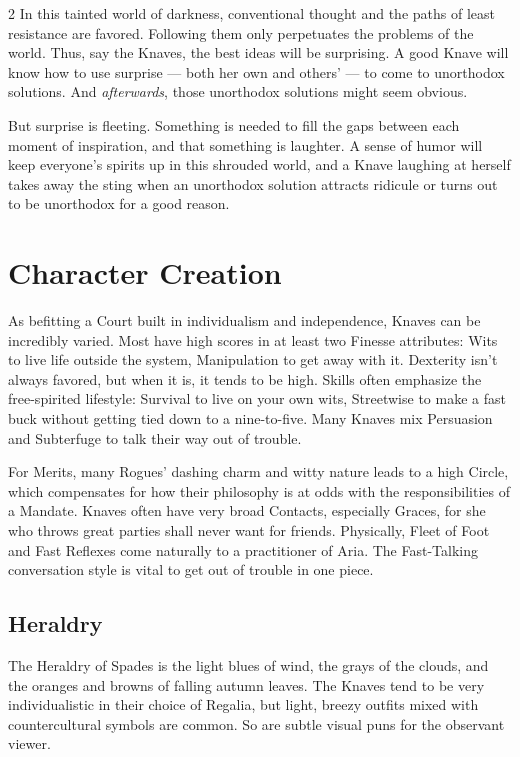 \begin{multicols}{2}
In this tainted world of darkness, conventional thought and the paths of least resistance are favored. Following them only perpetuates the problems of the world. Thus, say the Knaves, the best ideas will be surprising. A good Knave will know how to use surprise — both her own and others' — to come to unorthodox solutions. And \textit{afterwards}, those unorthodox solutions might seem obvious.

But surprise is fleeting. Something is needed to fill the gaps between each moment of inspiration, and that something is laughter. A sense of humor will keep everyone's spirits up in this shrouded world, and a Knave laughing at herself takes away the sting when an unorthodox solution attracts ridicule or turns out to be unorthodox for a good reason. 

\section*{Character Creation}

As befitting a Court built in individualism and independence, Knaves can be incredibly varied. Most have high scores in at least two Finesse attributes: Wits to live life outside the system, Manipulation to get away with it. Dexterity isn't always favored, but when it is, it tends to be high. Skills often emphasize the free-spirited lifestyle: Survival to live on your own wits, Streetwise to make a fast buck without getting tied down to a nine-to-five. Many Knaves mix Persuasion and Subterfuge to talk their way out of trouble.

For Merits, many Rogues' dashing charm and witty nature leads to a high Circle, which compensates for how their philosophy is at odds with the responsibilities of a Mandate. Knaves often have very broad Contacts, especially Graces, for she who throws great parties shall never want for friends. Physically, Fleet of Foot and Fast Reflexes come naturally to a practitioner of Aria. The Fast-Talking conversation style is vital to get out of trouble in one piece.

\subsection*{Heraldry}

The Heraldry of Spades is the light blues of wind, the grays of the clouds, and the oranges and browns of falling autumn leaves. The Knaves tend to be very individualistic in their choice of Regalia, but light, breezy outfits mixed with countercultural symbols are common. So are subtle visual puns for the observant viewer. 


\end{multicols}
